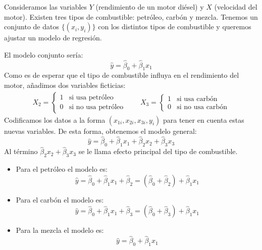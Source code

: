 \begin{example}
    Consideramos las variables $Y$ (rendimiento de un motor diésel) y $X$ (velocidad del motor).
    Existen tres tipos de combustible: petróleo, carbón y mezcla.
    Tenemos un conjunto de datos $\{(x_i, y_i)\}$ con los distintos tipos de combustible y queremos ajustar un modelo de regresión.

    El modelo conjunto sería:
    $$\hat{y} = \hat{\beta}_0 + \hat{\beta}_1x_1$$
    Como es de esperar que el tipo de combustible influya en el rendimiento del motor, añadimos dos variables ficticias:
    \begin{align*}
        X_2 = \begin{cases}
                  1 & \text{si usa petróleo}    \\
                  0 & \text{si no usa petróleo}
              \end{cases} \qquad
        X_3 = \begin{cases}
                  1 & \text{si usa carbón}    \\
                  0 & \text{si no usa carbón}
              \end{cases}
    \end{align*}
    Codificamos los datos a la forma $(x_{1i}, x_{2i}, x_{3i}, y_i)$ para tener en cuenta estas nuevas variables.
    De esta forma, obtenemos el modelo general:
    $$\hat{y} = \hat{\beta}_0 + \hat{\beta}_1x_1 + \hat{\beta}_2x_2 + \hat{\beta}_3x_3$$
    Al término $\hat{\beta}_2x_2 + \hat{\beta}_3x_3$ se le llama efecto principal del tipo de combustible.
    \begin{itemize}
        \item Para el petróleo el modelo es:
              $$\hat{y} = \hat{\beta}_0 + \hat{\beta}_1x_1 + \hat{\beta}_2 = (\hat{\beta}_0 + \hat{\beta}_2) + \hat{\beta}_1x_1$$
        \item Para el carbón el modelo es:
              $$\hat{y} = \hat{\beta}_0 + \hat{\beta}_1x_1 + \hat{\beta}_3 = (\hat{\beta}_0 + \hat{\beta}_3) + \hat{\beta}_1x_1$$
        \item Para la mezcla el modelo es:
              $$\hat{y} = \hat{\beta}_0 + \hat{\beta}_1x_1$$
    \end{itemize}


\end{example}
